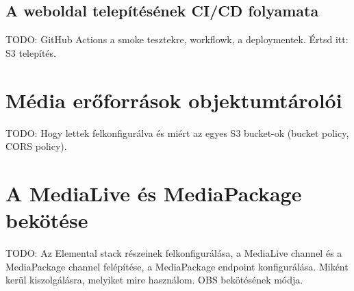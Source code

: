 \subsection{A weboldal telepítésének CI/CD folyamata}

TODO: GitHub Actions a smoke tesztekre, workflowk, a deploymentek. Értsd itt: S3 telepítés.

\section{Média erőforrások objektumtárolói}

TODO: Hogy lettek felkonfigurálva és miért az egyes S3 bucket-ok (bucket policy, CORS policy).

\section{A MediaLive és MediaPackage bekötése}

TODO: Az Elemental stack részeinek felkonfigurálása, a MediaLive channel és a MediaPackage channel felépítése, a MediaPackage endpoint konfigurálása. Miként kerül kiszolgálásra, melyiket mire használom. OBS bekötésének módja.
